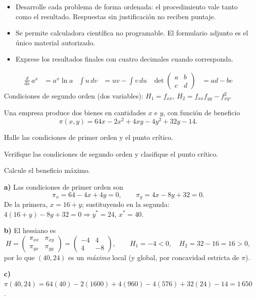 \documentclass{academic-exam}
\begin{document}
\membrete

\begin{instrucciones}
\begin{itemize}
  \item Desarrolle cada problema de forma ordenada: el procedimiento vale
        tanto como el resultado. Respuestas sin justificación no reciben
        puntaje.
  \item Se permite calculadora científica no programable. El formulario
        adjunto es el único material autorizado.
  \item Exprese los resultados finales con cuatro decimales cuando
        corresponda.
\end{itemize}
\end{instrucciones}


\begin{formulario}
\begin{align*}
  \frac{d}{dx}\,a^{x} &= a^{x}\ln a
  &\int u\,dv &= uv-\int v\,du
  &\det\!\begin{pmatrix} a & b\\ c & d\end{pmatrix} &= ad-bc
\end{align*}
Condiciones de segundo orden (dos variables): $H_1=f_{xx}$,\quad
$H_2=f_{xx}f_{yy}-f_{xy}^{2}$.
\end{formulario}

\begin{pregunta}[5][Optimización]
Una empresa produce dos bienes en cantidades $x$ e $y$, con función de
beneficio
\[
  \pi(x,y) = 64x - 2x^{2} + 4xy - 4y^{2} + 32y - 14.
\]
\begin{apartados}
  \item Halle las condiciones de primer orden y el punto crítico. 
  \item Verifique las condiciones de segundo orden y clasifique el punto
        crítico. 
  \item Calcule el beneficio máximo. 
\end{apartados}
\espaciorespuesta{8cm}
\begin{solucion}
\textbf{a)} Las condiciones de primer orden son
\[
  \pi_x = 64 - 4x + 4y = 0, \qquad
  \pi_y = 4x - 8y + 32 = 0.
\]
De la primera, $x = 16 + y$; sustituyendo en la segunda:
$4(16+y) - 8y + 32 = 0 \Rightarrow y^{*} = 24$, $x^{*} = 40$.

\textbf{b)} El hessiano es
\[
  H = \begin{pmatrix} \pi_{xx} & \pi_{xy}\\ \pi_{yx} & \pi_{yy}\end{pmatrix}
    = \begin{pmatrix} -4 & 4\\ 4 & -8\end{pmatrix},
  \qquad H_1 = -4 < 0,\quad H_2 = 32-16 = 16 > 0,
\]
por lo que $(40,24)$ es un \emph{máximo} local (y global, por concavidad
estricta de $\pi$).

\textbf{c)} $\pi(40,24) = 64(40) - 2(1600) + 4(960) - 4(576) + 32(24) - 14
= 1\,650$.
\end{solucion}
\end{pregunta}
\end{document}
